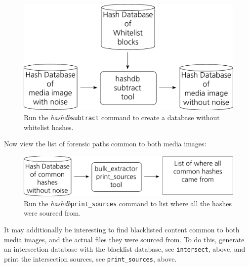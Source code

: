 \documentclass[12pt,twoside]{article}
\newcommand{\hdb}{\emph{hashdb}\xspace}
\begin{document}
\begin{figure}[H]
  \center
  \includegraphics[scale=0.6]{drawings/subtract_whitelist}
  \caption*{Run the \hdb \texttt{subtract} command to create a database without whitelist hashes.}
\end{figure}

Now view the list of forensic paths common to both media images:

\begin{figure}[H]
  \center
  \includegraphics[scale=0.6]{drawings/print_sources}
  \caption*{Run the \hdb \texttt{print\_sources} command to list where all the hashes were sourced from.}
\end{figure}

It may additionally be interesting to find blacklisted content common to both media images, and the actual files they were sourced from.
To do this, generate an intersection database with the blacklist database,
see \texttt{intersect}, above, and print the intersection sources,
see \texttt{print\_sources}, above.
\end{document}
